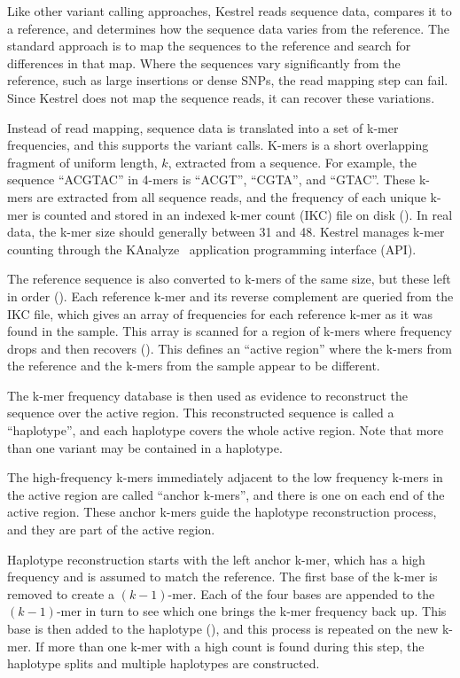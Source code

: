 Like other variant calling approaches, Kestrel reads sequence data, compares it to a reference, and determines how the sequence data varies from the reference. The standard approach is to map the sequences to the reference and search for differences in that map. Where the sequences vary significantly from the reference, such as large insertions or dense SNPs, the read mapping step can fail. Since Kestrel does not map the sequence reads, it can recover these variations.

Instead of read mapping, sequence data is translated into a set of k-mer frequencies, and this supports the variant calls. K-mers is a short overlapping fragment of uniform length, $k$, extracted from a sequence. For example, the sequence ``ACGTAC'' in 4-mers is ``ACGT'', ``CGTA'', and ``GTAC''. These k-mers are extracted from all sequence reads, and the frequency of each unique k-mer is counted and stored in an indexed k-mer count (IKC) file on disk (). In real data, the k-mer size should generally between 31 and 48. Kestrel manages k-mer counting through the KAnalyze~\cite{Audano2014} application programming interface (API).

The reference sequence is also converted to k-mers of the same size, but these left in order (). Each reference k-mer and its reverse complement are queried from the IKC file, which gives an array of frequencies for each reference k-mer as it was found in the sample. This array is scanned for a region of k-mers where frequency drops and then recovers (). This defines an ``active region'' where the k-mers from the reference and the k-mers from the sample appear to be different.

The k-mer frequency database is then used as evidence to reconstruct the sequence over the active region. This reconstructed sequence is called a ``haplotype'', and each haplotype covers the whole active region. Note that more than one variant may be contained in a haplotype.

The high-frequency k-mers immediately adjacent to the low frequency k-mers in the active region are called ``anchor k-mers'', and there is one on each end of the active region. These anchor k-mers guide the haplotype reconstruction process, and they are part of the active region.

Haplotype reconstruction starts with the left anchor k-mer, which has a high frequency and is assumed to match the reference. The first base of the k-mer is removed to create a $(k - 1)$-mer. Each of the four bases are appended to the $(k - 1)$-mer in turn to see which one brings the k-mer frequency back up. This base is then added to the haplotype (), and this process is repeated on the new k-mer. If more than one k-mer with a high count is found during this step, the haplotype splits and multiple haplotypes are constructed.

